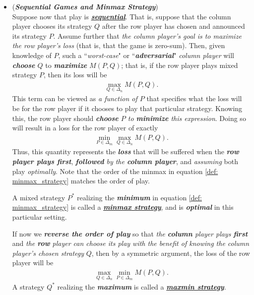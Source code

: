 \documentclass[11pt]{article}
\begin{document}
\begin{itemize}
\item \begin{definition}(\textbf{\emph{Sequential  Games and Minmax Strategy}}) \citep{schapire2012boosting, mohri2018foundations} \\
Suppose now that play is \underline{\emph{\textbf{sequential}}}. That is, suppose that the column player chooses its strategy $Q$ after the row player has chosen and announced its strategy $P$. Assume further that \emph{the column player's goal is to maximize the row player's loss} (that is, that the game is zero-sum). Then, given knowledge of $P$, such a ``\emph{worst-case}" or ``\emph{\textbf{adversarial}}" \emph{column player} will \emph{\textbf{choose} $Q$} to \emph{\textbf{maximize}} $M(P, Q)$; that is, if the row player plays mixed strategy $P$, then its loss will be
\begin{align*}
\max_{Q \in \Delta_{n}}M(P, Q).
\end{align*} This term can be viewed as \emph{a function of $P$} that specifies what the loss will be for the row player if it chooses to play that particular strategy. Knowing this, the row player should \emph{\textbf{choose} $P$ to \textbf{minimize} this expression}. Doing so will result in a loss for the row player of exactly
\begin{align}
\min_{P \in \Delta_{m}}\max_{Q \in \Delta_{n}}M(P, Q). \label{def: minmax_strategy}
\end{align} Thus, this quantity represents the \emph{\textbf{loss}} that will be suffered when the \emph{\textbf{row player plays first}}, \emph{\textbf{followed} by the \textbf{column player}}, and \emph{assuming} both play \emph{optimally}. Note that the order of the minmax in equation \eqref{def: minmax_strategy} matches the order of play.

A mixed strategy $P^{*}$ realizing the \emph{\textbf{minimum}} in equation \eqref{def: minmax_strategy} is called a \underline{\emph{\textbf{minmax strategy}}}, and is \emph{\textbf{optimal}} in this particular setting.

If now we \emph{\textbf{reverse the order of play}} so that \emph{the \textbf{column} player plays \textbf{first}} and \emph{the \textbf{row} player can choose its play with the benefit of knowing the column player’s chosen strategy} $Q$, then by a symmetric argument, the loss of the row player will be
\begin{align}
\max_{Q \in \Delta_{n}}\min_{P \in \Delta_{m}}M(P, Q). \label{def: minmax_strategy_reverse}
\end{align} A strategy $Q^{*}$ realizing the \emph{\textbf{maximum}} is called a \underline{\emph{\textbf{maxmin strategy}}}.
\end{definition}


\end{itemize}
\end{document}
